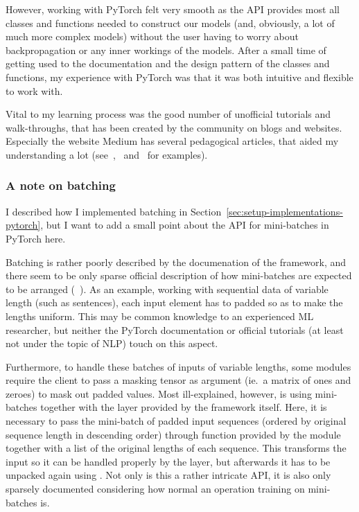 However, working with PyTorch felt very smooth as the API provides most all
classes and functions needed to construct our models (and, obviously, a lot of
much more complex models) without the user having to worry about backpropagation
or any inner workings of the models. After a small time of getting used to the
documentation and the design pattern of the classes and functions, my experience
with PyTorch was that it was both intuitive and flexible to work with.

Vital to my learning process was the good number of unofficial tutorials and
walk-throughs, that has been created by the community on blogs and websites.
Especially the website Medium has several pedagogical articles, that aided my
understanding a lot (see~\cite{falcon2018lstms},~\cite{boulton2018conditional}
and~\cite{treviso2019crf} for examples).

\subsubsection*{A note on batching}

I described how I implemented batching in
Section~\ref{sec:setup-implementations-pytorch}, but I want to add a small point
about the API for mini-batches in PyTorch here.

Batching is rather poorly described by the documenation of the framework, and
there seem to be only sparse official description of how mini-batches are
expected to be arranged (~\cite{falcon2018lstms}).  As an example, working with
sequential data of variable length (such as sentences), each input element has
to padded so as to make the lengths uniform.  This may be common knowledge to an
experienced ML researcher, but neither the PyTorch documentation or official
tutorials (at least not under the topic of NLP) touch on this aspect.

Furthermore, to handle these batches of inputs of variable lengths, some modules
require the client to pass a masking tensor as argument (ie.\ a matrix of ones
and zeroes) to mask out padded values. Most ill-explained, however, is using
mini-batches together with the  layer provided by the framework
itself. Here, it is necessary to pass the mini-batch of padded input sequences
(ordered by original sequence length in descending order) through
 function provided by the 
module together with a list of the original lengths of each sequence. This
transforms the input so it can be handled properly by the  layer, but
afterwards it has to be unpacked again using . Not
only is this a rather intricate API, it is also only sparsely documented
considering how normal an operation training on mini-batches is.



